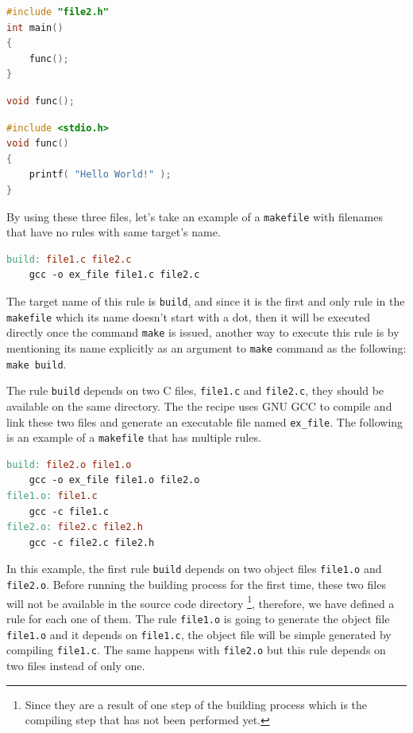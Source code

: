\begin{lstlisting}[language=C]
#include "file2.h"
int main()
{
    func();
}
\end{lstlisting}

\begin{lstlisting}[language=C]
void func();
\end{lstlisting}

\begin{lstlisting}[language=C]
#include <stdio.h>
void func()
{
    printf( "Hello World!" );
}
\end{lstlisting}

By using these three files, let's take an example of a
\lstinline!makefile! with filenames that have no rules with same
target's name.

\begin{lstlisting}[language=make]
build: file1.c file2.c
    gcc -o ex_file file1.c file2.c
\end{lstlisting}

The target name of this rule is \lstinline!build!, and since it is the
first and only rule in the \lstinline!makefile! which its name doesn't
start with a dot, then it will be executed directly once the command
\lstinline!make! is issued, another way to execute this rule is by
mentioning its name explicitly as an argument to \lstinline!make!
command as the following: \lstinline!make build!.

The rule \lstinline!build! depends on two C files, \lstinline!file1.c!
and \lstinline!file2.c!, they should be available on the same directory.
The the recipe uses GNU GCC to compile and link these two files and
generate an executable file named \lstinline!ex_file!. The following is
an example of a \lstinline!makefile! that has multiple rules.

\begin{lstlisting}[language=make]
build: file2.o file1.o
    gcc -o ex_file file1.o file2.o
file1.o: file1.c
    gcc -c file1.c
file2.o: file2.c file2.h
    gcc -c file2.c file2.h
\end{lstlisting}

In this example, the first rule \lstinline!build! depends on two object
files \lstinline!file1.o! and \lstinline!file2.o!. Before running the
building process for the first time, these two files will not be
available in the source code directory \footnote{Since they are a result
  of one step of the building process which is the compiling step that
  has not been performed yet.}, therefore, we have defined a rule for
each one of them. The rule \lstinline!file1.o! is going to generate the
object file \lstinline!file1.o! and it depends on \lstinline!file1.c!,
the object file will be simple generated by compiling
\lstinline!file1.c!. The same happens with \lstinline!file2.o! but this
rule depends on two files instead of only one.

